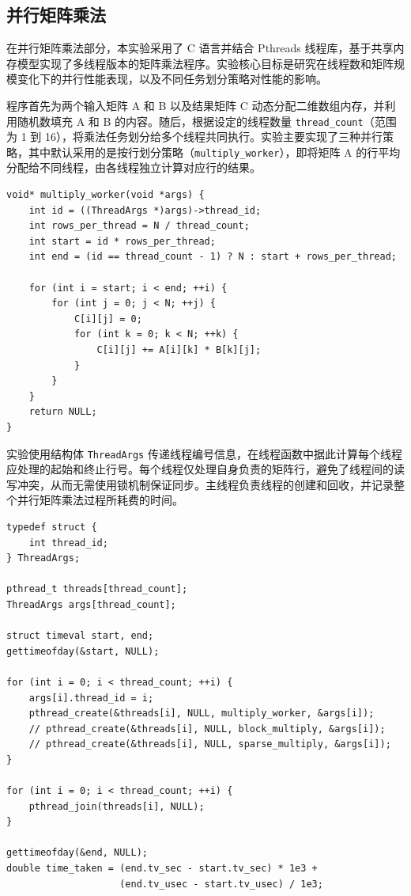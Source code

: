 \documentclass[a4paper, utf8]{ctexart}
\begin{document}
	\subsection{并行矩阵乘法}
	
	在并行矩阵乘法部分，本实验采用了 C 语言并结合 Pthreads 线程库，基于共享内存模型实现了多线程版本的矩阵乘法程序。实验核心目标是研究在线程数和矩阵规模变化下的并行性能表现，以及不同任务划分策略对性能的影响。
	
	程序首先为两个输入矩阵 A 和 B 以及结果矩阵 C 动态分配二维数组内存，并利用随机数填充 A 和 B 的内容。随后，根据设定的线程数量 \verb|thread_count|（范围为 1 到 16），将乘法任务划分给多个线程共同执行。实验主要实现了三种并行策略，其中默认采用的是按行划分策略（\verb|multiply_worker|），即将矩阵 A 的行平均分配给不同线程，由各线程独立计算对应行的结果。
	
	\begin{verbatim}
void* multiply_worker(void *args) {
    int id = ((ThreadArgs *)args)->thread_id;
    int rows_per_thread = N / thread_count;
    int start = id * rows_per_thread;
    int end = (id == thread_count - 1) ? N : start + rows_per_thread;

    for (int i = start; i < end; ++i) {
        for (int j = 0; j < N; ++j) {
            C[i][j] = 0;
            for (int k = 0; k < N; ++k) {
                C[i][j] += A[i][k] * B[k][j];
            }
        }
    }
    return NULL;
}
	\end{verbatim}
	
	实验使用结构体 \verb|ThreadArgs| 传递线程编号信息，在线程函数中据此计算每个线程应处理的起始和终止行号。每个线程仅处理自身负责的矩阵行，避免了线程间的读写冲突，从而无需使用锁机制保证同步。主线程负责线程的创建和回收，并记录整个并行矩阵乘法过程所耗费的时间。
	
	
	\begin{verbatim}
typedef struct {
    int thread_id;
} ThreadArgs;

pthread_t threads[thread_count];
ThreadArgs args[thread_count];

struct timeval start, end;
gettimeofday(&start, NULL);

for (int i = 0; i < thread_count; ++i) {
    args[i].thread_id = i;
    pthread_create(&threads[i], NULL, multiply_worker, &args[i]);
    // pthread_create(&threads[i], NULL, block_multiply, &args[i]);
    // pthread_create(&threads[i], NULL, sparse_multiply, &args[i]);
}

for (int i = 0; i < thread_count; ++i) {
    pthread_join(threads[i], NULL);
}

gettimeofday(&end, NULL);
double time_taken = (end.tv_sec - start.tv_sec) * 1e3 +
                    (end.tv_usec - start.tv_usec) / 1e3;
	\end{verbatim}
	
\end{document}
